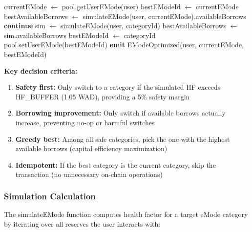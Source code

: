 \begin{algorithm}
\caption{OptimizeEMode Decision Algorithm}\label{alg:optimize-emode}
\begin{algorithmic}[1]
    \State currentEMode $\gets$ pool.getUserEMode(user)
    \State bestEModeId $\gets$ currentEMode
    \State bestAvailableBorrows $\gets$ simulateEMode(user, currentEMode).availableBorrows
            \State \textbf{continue}
        \EndIf
        \State sim $\gets$ simulateEMode(user, categoryId)
            \State bestAvailableBorrows $\gets$ sim.availableBorrows
            \State bestEModeId $\gets$ categoryId
        \EndIf
    \EndFor
        \State pool.setUserEMode(bestEModeId)
        \State \textbf{emit} EModeOptimized(user, currentEMode, bestEModeId)
    \EndIf
\EndFunction
\end{algorithmic}
\end{algorithm}

\textbf{Key decision criteria:}
\begin{enumerate}
    \item \textbf{Safety first:} Only switch to a category if the simulated HF exceeds HF\_BUFFER (1.05 WAD), providing a 5\% safety margin
    \item \textbf{Borrowing improvement:} Only switch if available borrows actually increase, preventing no-op or harmful switches
    \item \textbf{Greedy best:} Among all safe categories, pick the one with the highest available borrows (capital efficiency maximization)
    \item \textbf{Idempotent:} If the best category is the current category, skip the transaction (no unnecessary on-chain operations)
\end{enumerate}

\subsubsection{Simulation Calculation}

The simulateEMode function computes health factor for a target eMode category by iterating over all reserves the user interacts with:

